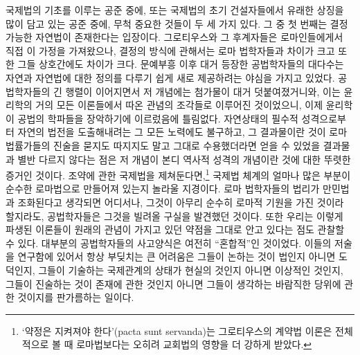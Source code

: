 국제법의 기초를 이루는 공준 중에,
또는 국제법의 초기 건설자들에서 유래한 상징을 많이 담고 있는 공준 중에,
무척 중요한 것들이 두 세 가지 있다.
그 중 첫 번째는 결정가능한 자연법이 존재한다는 입장이다.
그로티우스와 그 후계자들은 로마인들에게서 직접 이 가정을 가져왔으나,
결정의 방식에 관해서는
로마 법학자들과 차이가 크고 또한 그들 상호간에도 차이가 크다.
문예부흥 이후 대거 등장한 공법학자들의 대다수는
자연과 자연법에 대한 정의를 다루기 쉽게 새로 제공하려는
야심을 가지고 있었다.
공법학자들의 긴 행렬이 이어지면서 저 개념에는 첨가물이 대거 덧붙여졌거니와,
이는 윤리학의 거의 모든 이론들에서 따온 관념의 조각들로 이루어진 것이었으니,
이제 윤리학이 공법의 학파들을 장악하기에 이르렀음에 틀림없다.
자연상태의 필수적 성격으로부터 자연의 법전을 도출해내려는
그 모든 노력에도 불구하고, 그 결과물이란 것이
로마 법률가들의 진술을 묻지도 따지지도 말고 그대로 수용했더라면
얻을 수 있었을 결과물과 별반 다르지 않다는 점은
저 개념이 본디 역사적 성격의 개념이란 것에 대한 뚜렷한 증거인 것이다.
조약에 관한 국제법을 제쳐둔다면,\footnote{%
  `약정은 지켜져야 한다'(pacta sunt servanda)는
  그로티우스의 계약법 이론은 전체적으로 볼 때
  로마법보다는 오히려 교회법의 영향을 더 강하게 받았다.}
국제법 체계의 얼마나 많은 부분이 순수한 로마법으로 만들어져 있는지
놀라울 지경이다.
로마 법학자들의 법리가 만민법과 조화된다고 생각되면
어디서나,
그것이 아무리 순수히 로마적 기원을 가진 것이라 할지라도,
공법학자들은 그것을 빌려올 구실을 발견했던 것이다.
또한 우리는
이렇게 파생된 이론들이
원래의 관념이 가지고 있던 약점을
그대로 안고 있다는 점도 관찰할 수 있다.
대부분의 공법학자들의 사고양식은 여전히 ``혼합적''인 것이었다.
이들의 저술을 연구함에 있어서 항상 부딪치는 큰 어려움은
그들이 논하는 것이 법인지 아니면 도덕인지,
그들이 기술하는 국제관계의 상태가 현실의 것인지 아니면 이상적인 것인지,
그들이 진술하는 것이 존재에 관한 것인지 아니면
그들이 생각하는 바람직한 당위에 관한 것이지를 판가름하는 일이다.


